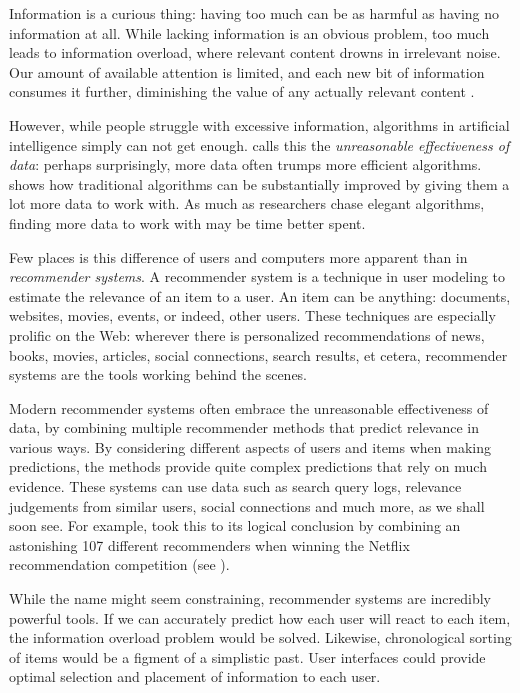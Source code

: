 \label{chap:intro}

Information is a curious thing:
having too much can be as harmful as having no information at all.
While lacking information is an obvious problem,
too much leads to information overload,
where relevant content drowns in irrelevant noise.
Our amount of available attention is limited, and each new bit
of information consumes it further,
diminishing the value of any actually relevant content
\cite[p1]{Davenport2001}.

However, while people struggle with excessive information,
algorithms in artificial intelligence simply can not get enough.
\citet[p1]{Halevy2009} calls this the \emph{unreasonable effectiveness of data}:
perhaps surprisingly, more data often trumps more efficient algorithms.
\citet[p3]{Banko2001} shows how traditional algorithms can be substantially
improved by giving them a lot more data to work with.
As much as researchers chase elegant algorithms,
finding more data to work with may be time better spent.

Few places is this difference of users and computers more apparent than in \emph{recommender systems}.
A recommender system is a technique in user modeling to estimate the relevance of an item to a user.
An item can be anything: documents, websites, movies, events, or indeed, other users.
These techniques are especially prolific on the Web: 
wherever there is personalized recommendations of news, books, movies,
articles, social connections, search results, et cetera, recommender systems are the tools
working behind the scenes.

Modern recommender systems often embrace the unreasonable effectiveness of data,
by combining multiple recommender methods that predict relevance in various ways.
By considering different aspects of users and items when making predictions,
the methods provide quite complex predictions that rely on much evidence.
These systems can use data such as search query logs, relevance judgements from similar users,
social connections and much more, as we shall soon see.
For example, \citet[p1]{Bell2007} took this to its logical conclusion by 
combining an astonishing 107 different recommenders when winning the Netflix recommendation competition
(see \citet{Linden2009}).

While the name might seem constraining, recommender systems are incredibly powerful tools.
If we can accurately predict how each user will react to each item, the information overload problem would be solved.
Likewise, chronological sorting of items would be a figment of a simplistic past.
User interfaces could provide optimal selection and placement of information to each user.

